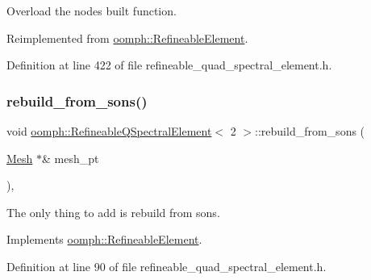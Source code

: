 Overload the nodes built function. 



Reimplemented from \hyperlink{classoomph_1_1RefineableElement_a50758228db823d72ea8da23dbb000901}{oomph\+::\+Refineable\+Element}.



Definition at line 422 of file refineable\+\_\+quad\+\_\+spectral\+\_\+element.\+h.

\mbox{\label{classoomph_1_1RefineableQSpectralElement_3_012_01_4_a46a713943b11c207d06a677bfe1cf162}} 
\subsubsection{\texorpdfstring{rebuild\+\_\+from\+\_\+sons()}{rebuild\_from\_sons()}}
{\footnotesize\ttfamily void \hyperlink{classoomph_1_1RefineableQSpectralElement}{oomph\+::\+Refineable\+Q\+Spectral\+Element}$<$ 2 $>$\+::rebuild\+\_\+from\+\_\+sons (\begin{DoxyParamCaption}\item[{\hyperlink{classoomph_1_1Mesh}{Mesh} $\ast$\&}]{mesh\+\_\+pt }\end{DoxyParamCaption})\hspace{0.3cm}{\ttfamily [inline]}, {\ttfamily [virtual]}}



The only thing to add is rebuild from sons. 



Implements \hyperlink{classoomph_1_1RefineableElement_a33324be27833fa4b78279d17158215fa}{oomph\+::\+Refineable\+Element}.



Definition at line 90 of file refineable\+\_\+quad\+\_\+spectral\+\_\+element.\+h.



